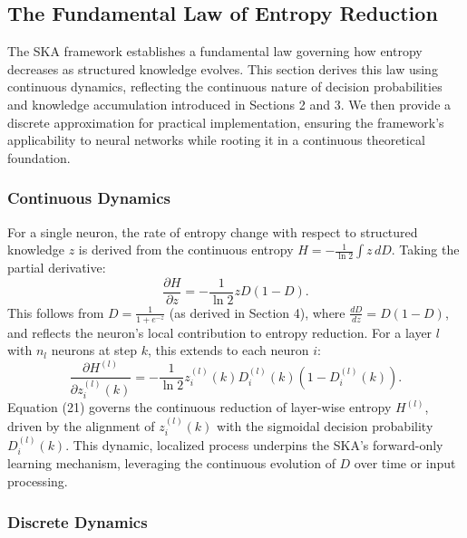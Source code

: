 \documentclass{article}
\begin{document}
	
\subsection{The Fundamental Law of Entropy Reduction}

The SKA framework establishes a fundamental law governing how entropy decreases as structured knowledge evolves. This section derives this law using continuous dynamics, reflecting the continuous nature of decision probabilities and knowledge accumulation introduced in Sections 2 and 3. We then provide a discrete approximation for practical implementation, ensuring the framework’s applicability to neural networks while rooting it in a continuous theoretical foundation.

\subsubsection{Continuous Dynamics}

For a single neuron, the rate of entropy change with respect to structured knowledge \( z \) is derived from the continuous entropy \( H = -\frac{1}{\ln 2} \int z \, dD \). Taking the partial derivative:
\begin{equation}
	\frac{\partial H}{\partial z} = -\frac{1}{\ln 2} z D (1 - D).
\end{equation}
This follows from \( D = \frac{1}{1 + e^{-z}} \) (as derived in Section 4), where \( \frac{dD}{dz} = D (1 - D) \), and reflects the neuron’s local contribution to entropy reduction. For a layer \( l \) with \( n_l \) neurons at step \( k \), this extends to each neuron \( i \):
\begin{equation}
	\frac{\partial H^{(l)}}{\partial z_i^{(l)}(k)} = -\frac{1}{\ln 2} z_i^{(l)}(k) D_i^{(l)}(k) \left(1 - D_i^{(l)}(k)\right).
\end{equation}
Equation (21) governs the continuous reduction of layer-wise entropy \( H^{(l)} \), driven by the alignment of \( z_i^{(l)}(k) \) with the sigmoidal decision probability \( D_i^{(l)}(k) \). This dynamic, localized process underpins the SKA’s forward-only learning mechanism, leveraging the continuous evolution of \( D \) over time or input processing.

\subsubsection{Discrete Dynamics}
\end{document}
